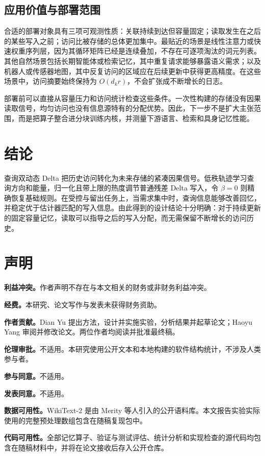 \documentclass[11pt,a4paper]{ctexart}
\begin{document}
\subsection{应用价值与部署范围}

合适的部署对象具有三项可观测性质：关联持续到达但容量固定；读取发生在之后的某些写入之前；访问比被存储的总体更加集中。最贴近的场景是线性注意力或快速权重序列层，因为其循环矩阵已经是连续叠加，不存在可逐项淘汰的词元列表。其他自然场景包括长期智能体或检索记忆，其中重复请求能够暴露语义需求；以及机器人或传感器地图，其中反复访问的区域应在后续更新中获得更高精度。在这些场景中，访问摘要始终保持为 $O(d_kr)$，不会扩张成不断增长的日志。

部署前可以直接从容量压力和访问统计检查这些条件。一次性构建的存储没有因果读取信号，均匀访问也没有信息源特有的分配优势。因此，下一步不是扩大主张范围，而是把算子整合进分块训练内核，并测量下游语言、检索和具身记忆性能。

\section{结论}\label{sec:conclusion-zh}

查询双动态 Delta 把历史访问转化为未来存储的紧凑因果信号。低秩轨迹学习查询方向和能量，归一化且带上限的热度调节普通残差 Delta 写入，令 $\beta=0$ 则精确恢复基础规则。在受控与留出任务上，当需求集中时，查询信息能够改善回忆，并稳定优于估计器匹配的写入信息。由此得到的设计结论十分明确：对于持续更新的固定容量记忆，读取可以指导之后的写入分配，而无需保留不断增长的访问历史。

\section*{声明}

\noindent\textbf{利益冲突。}作者声明不存在与本文相关的财务或非财务利益冲突。

\noindent\textbf{经费。}本研究、论文写作与发表未获得财务资助。

\noindent\textbf{作者贡献。}Dian Yu 提出方法，设计并实施实验，分析结果并起草论文；Haoyu Yang 审阅并修改论文。两位作者均阅读并批准最终稿。

\noindent\textbf{伦理审批。}不适用。本研究使用公开文本和本地构建的软件结构统计，不涉及人类参与者。

\noindent\textbf{参与同意。}不适用。

\noindent\textbf{发表同意。}不适用。

\noindent\textbf{数据可用性。}WikiText-2 是由 Merity 等人引入的公开语料库\cite{merity2016wikitext}。本文报告实验实际使用的完整预处理数组包含在随稿复现包中。

\noindent\textbf{代码可用性。}全部记忆算子、验证与测试评估、统计分析和实现检查的源代码均包含在随稿材料中，并将在论文接收后存入公开仓库。



\end{document}
